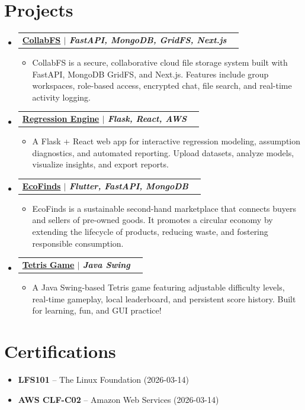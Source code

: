 \documentclass[a4paper,10pt]{article}
\makeatletter
\newcommand{\resumeItem}[1]{
  \item\small{#1 \vspace{-2pt}}
}
\newcommand{\resumeProjectHeading}[2]{
  \vspace{-1pt}\item
    \begin{tabular*}{0.97\textwidth}{l@{\extracolsep{\fill}}r}
      \textbf{#1} & \textit{\small#2} \\
    \end{tabular*}\vspace{-5pt}
}
\newcommand{\resumeSubHeadingListStart}{\begin{itemize}[leftmargin=0.15in, label={}]}
\newcommand{\resumeSubHeadingListEnd}{\end{itemize}}
\newcommand{\resumeItemListStart}{\begin{itemize}[leftmargin=0.2in]}
\newcommand{\resumeItemListEnd}{\end{itemize}\vspace{-5pt}}
\makeatother
\begin{document}
\section{Projects}
\resumeSubHeadingListStart
  \resumeProjectHeading
    {\href{https://github.com/Ganeshkumar-K-S/CollabFS}{CollabFS} $|$ \textit{\small FastAPI, MongoDB, GridFS, Next.js}}{}
        \resumeItemListStart
            \resumeItem{CollabFS is a secure, collaborative cloud file storage system built with FastAPI, MongoDB GridFS, and Next.js. Features include group workspaces, role-based access, encrypted chat, file search, and real-time activity logging.}
          \resumeItemListEnd
      \resumeProjectHeading
    {\href{https://github.com/Ganeshkumar-K-S/Regression\_Engine}{Regression Engine} $|$ \textit{\small Flask, React, AWS}}{}
        \resumeItemListStart
            \resumeItem{A Flask + React web app for interactive regression modeling, assumption diagnostics, and automated reporting. Upload datasets, analyze models, visualize insights, and export reports.}
          \resumeItemListEnd
      \resumeProjectHeading
    {\href{https://github.com/Ganeshkumar-K-S/EcoFinds}{EcoFinds} $|$ \textit{\small Flutter, FastAPI, MongoDB}}{}
        \resumeItemListStart
            \resumeItem{EcoFinds is a sustainable second-hand marketplace that connects buyers and sellers of pre-owned goods. It promotes a circular economy by extending the lifecycle of products, reducing waste, and fostering responsible consumption.}
          \resumeItemListEnd
      \resumeProjectHeading
    {\href{https://github.com/Ganeshkumar-K-S/Tetris-Game}{Tetris Game} $|$ \textit{\small Java Swing}}{}
        \resumeItemListStart
            \resumeItem{A Java Swing-based Tetris game featuring adjustable difficulty levels, real-time gameplay, local leaderboard, and persistent score history. Built for learning, fun, and GUI practice!}
          \resumeItemListEnd
    \resumeSubHeadingListEnd
\vspace{4pt}


\section{Certifications}
\resumeSubHeadingListStart
  \item \small{%
    \textbf{LFS101}%
     -- The Linux Foundation%
     (2026-03-14)%
  }
  \item \small{%
    \textbf{AWS CLF-C02}%
     -- Amazon Web Services%
     (2026-03-14)%
  }
\resumeSubHeadingListEnd
\vspace{4pt}
\end{document}
